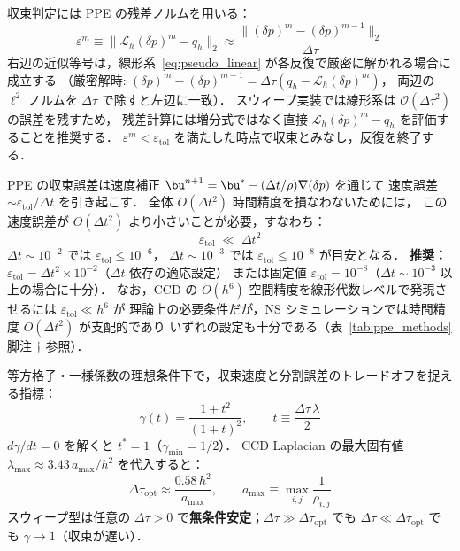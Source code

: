 収束判定には PPE の残差ノルムを用いる：
\begin{equation}
  \varepsilon^m \equiv \bigl\|\mathcal{L}_h(\delta p)^m - q_h\bigr\|_2
  \approx \frac{\bigl\|(\delta p)^m - (\delta p)^{m-1}\bigr\|_2}{\Delta\tau}
  \label{eq:residual}
\end{equation}
右辺の近似等号は，線形系~\eqref{eq:pseudo_linear} が各反復で厳密に解かれる場合に成立する
（厳密解時: $(\delta p)^m - (\delta p)^{m-1} = \Delta\tau(q_h - \mathcal{L}_h(\delta p)^m)$，
両辺の $\ell^2$ ノルムを $\Delta\tau$ で除すと左辺に一致）．
スウィープ実装では線形系は $\mathcal{O}(\Delta\tau^2)$ の誤差を残すため，
残差計算には増分式ではなく直接 $\mathcal{L}_h(\delta p)^m - q_h$ を評価することを推奨する．
$\varepsilon^m < \varepsilon_{\mathrm{tol}}$ を満たした時点で収束とみなし，反復を終了する．

\begin{tcolorbox}[resultbox, title={$\varepsilon_{\mathrm{tol}}$ 選択の実用基準}]
\label{result:etol_criterion}
PPE の収束誤差は速度補正 $\bu^{n+1} = \bu^* - (\Delta t/\rho)\nabla(\delta p)$ を通じて
速度誤差 $\sim \varepsilon_\mathrm{tol}/\Delta t$ を引き起こす．
全体 $O(\Delta t^2)$ 時間精度を損なわないためには，
この速度誤差が $O(\Delta t^2)$ より小さいことが必要，すなわち：
\begin{equation}
  \varepsilon_\mathrm{tol} \;\ll\; \Delta t^2
  \label{eq:etol_physical}
\end{equation}
$\Delta t \sim 10^{-2}$ では $\varepsilon_\mathrm{tol} \leq 10^{-6}$，
$\Delta t \sim 10^{-3}$ では $\varepsilon_\mathrm{tol} \leq 10^{-8}$ が目安となる．
\textbf{推奨：} $\varepsilon_\mathrm{tol} = \Delta t^2 \times 10^{-2}$（$\Delta t$ 依存の適応設定）
または固定値 $\varepsilon_\mathrm{tol} = 10^{-8}$（$\Delta t \sim 10^{-3}$ 以上の場合に十分）．
なお，CCD の $O(h^6)$ 空間精度を線形代数レベルで発現させるには $\varepsilon_\mathrm{tol} \ll h^6$ が
理論上の必要条件だが，NS シミュレーションでは時間精度 $O(\Delta t^2)$ が支配的であり
いずれの設定も十分である（表~\ref{tab:ppe_methods} 脚注 $\dagger$ 参照）．
\end{tcolorbox}

\begin{tcolorbox}[resultbox, title={最適仮想時間刻み $\Delta\tau$ の理論（詳細：付録 §\ref{sec:dtau_derive}）}]
\label{result:dtau_opt}
等方格子・一様係数の理想条件下で，収束速度と分割誤差のトレードオフを捉える指標：
\[
  \gamma(t) = \frac{1 + t^2}{(1+t)^2},
  \qquad t \equiv \frac{\Delta\tau\,\lambda}{2}
\]
$d\gamma/dt = 0$ を解くと $t^* = 1$（$\gamma_{\min} = 1/2$）．
CCD Laplacian の最大固有値 $\lambda_{\max} \approx 3.43\,a_{\max}/h^2$ を代入すると：
\begin{equation}
  \Delta\tau_{\mathrm{opt}}
  \approx \frac{0.58\,h^2}{a_{\max}},
  \qquad
  a_{\max} \equiv \max_{i,j} \frac{1}{\rho_{i,j}}
  \label{eq:dtau_opt}
\end{equation}
スウィープ型は任意の $\Delta\tau > 0$ で\textbf{無条件安定}；$\Delta\tau \gg \Delta\tau_{\mathrm{opt}}$ でも $\Delta\tau \ll \Delta\tau_{\mathrm{opt}}$ でも $\gamma \to 1$（収束が遅い）．
\end{tcolorbox}

